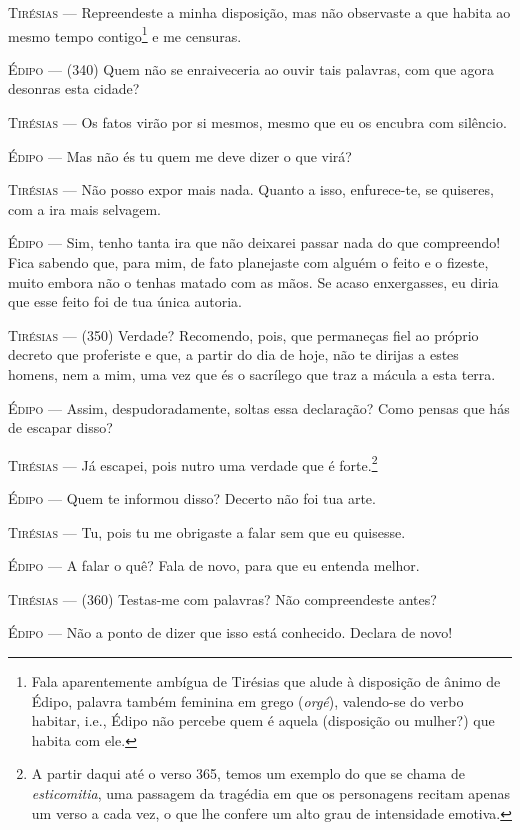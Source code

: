 \textsc{Tirésias} --- Repreendeste a minha disposição, mas não observaste a que habita ao
mesmo tempo contigo\footnote{Fala aparentemente ambígua de Tirésias que
  alude à disposição de ânimo de Édipo, palavra também feminina em grego
  (\emph{orgé}), valendo-se do verbo habitar, i.e., Édipo não percebe
  quem é aquela (disposição ou mulher?) que habita com ele.} e me
censuras.

\textsc{Édipo} --- (340) Quem não se enraiveceria ao ouvir tais palavras, com que agora
desonras esta cidade?

\textsc{Tirésias} --- Os fatos virão por si mesmos, mesmo que eu os encubra com silêncio.

\textsc{Édipo} --- Mas não és tu quem me deve dizer o que virá?

\textsc{Tirésias} --- Não posso expor mais nada. Quanto a isso, enfurece-te, se quiseres, com
a ira mais selvagem.

\textsc{Édipo} --- Sim, tenho tanta ira que não deixarei passar nada do que compreendo!
Fica sabendo que, para mim, de fato planejaste com alguém o feito e o
fizeste, muito embora não o tenhas matado com as mãos. Se acaso
enxergasses, eu diria que esse feito foi de tua única autoria.

\textsc{Tirésias} --- (350) Verdade? Recomendo, pois, que permaneças fiel ao próprio decreto
que proferiste e que, a partir do dia de hoje, não te dirijas a estes
homens, nem a mim, uma vez que és o sacrílego que traz a mácula a esta
terra.

\textsc{Édipo} --- Assim, despudoradamente, soltas essa declaração? Como pensas que hás de
escapar disso?

\textsc{Tirésias} --- Já escapei, pois nutro uma verdade que é forte.\footnote{A partir daqui até o verso 365, temos um
  exemplo do que se chama de \emph{esticomitia}, uma passagem da
  tragédia em que os personagens recitam apenas um verso a cada vez, o
  que lhe confere um alto grau de intensidade emotiva.}

\textsc{Édipo} --- Quem te informou disso? Decerto não foi tua arte.

\textsc{Tirésias} --- Tu, pois tu me obrigaste a falar sem que eu quisesse.

\textsc{Édipo} --- A falar o quê? Fala de novo, para que eu entenda melhor.

\textsc{Tirésias} --- (360) Testas-me com palavras? Não compreendeste antes?

\textsc{Édipo} --- Não a ponto de dizer que isso está conhecido. Declara de novo!

